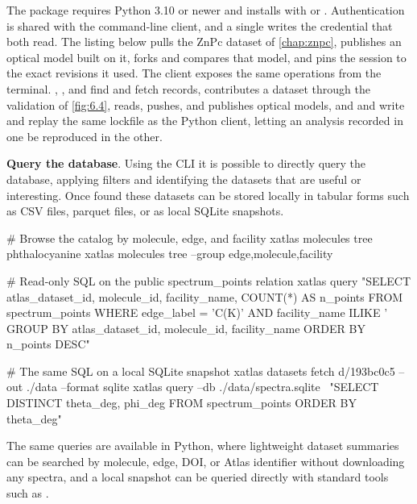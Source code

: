 The package requires Python 3.10 or newer and installs with  or . Authentication is shared with the command-line client, and a single  writes the credential that both read. The listing below pulls the ZnPc dataset of \cref{chap:znpc}, publishes an optical model built on it, forks and compares that model, and pins the session to the exact revisions it used. The  client exposes the same operations from the terminal. , , and  find and fetch records,  contributes a dataset through the validation of \cref{fig:6.4},  reads, pushes, and publishes optical models, and  and  write and replay the same lockfile as the Python client, letting an analysis recorded in one be reproduced in the other.

\textbf{Query the database}. Using the CLI it is possible to directly query the database, applying filters and identifying the datasets that are useful or interesting. Once found these datasets can be stored locally in tabular forms such as CSV files, parquet files, or as local SQLite snapshots.

\begin{codeblock}
# Browse the catalog by molecule, edge, and facility
xatlas molecules tree phthalocyanine
xatlas molecules tree --group edge,molecule,facility

# Read-only SQL on the public spectrum_points relation
xatlas query "SELECT atlas_dataset_id, molecule_id, facility_name, COUNT(*) AS n_points
              FROM spectrum_points
              WHERE edge_label = 'C(K)' AND facility_name ILIKE '%
              GROUP BY atlas_dataset_id, molecule_id, facility_name
              ORDER BY n_points DESC"

# The same SQL on a local SQLite snapshot
xatlas datasets fetch d/193bc0c5 --out ./data --format sqlite
xatlas query --db ./data/spectra.sqlite \
    "SELECT DISTINCT theta_deg, phi_deg FROM spectrum_points ORDER BY theta_deg"
\end{codeblock}

The same queries are available in Python, where lightweight dataset summaries can be searched by molecule, edge, DOI, or Atlas identifier without downloading any spectra, and a local snapshot can be queried directly with standard tools such as .

